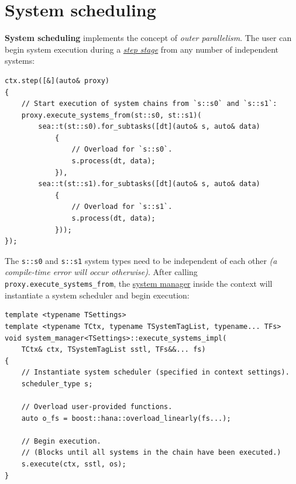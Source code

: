 \documentclass[oneside, 12pt, a4paper, openany]{book}
\begin{document}
\section{System scheduling}\label{system-scheduling}

\textbf{System scheduling} implements the concept of \emph{outer
parallelism}. The user can begin system execution during a
\protect\hyperlink{step_stage}{\emph{step stage}} from any number of
independent systems:

\begin{verbatim}
ctx.step([&](auto& proxy)
{
    // Start execution of system chains from `s::s0` and `s::s1`:
    proxy.execute_systems_from(st::s0, st::s1)(
        sea::t(st::s0).for_subtasks([dt](auto& s, auto& data)
            {
                // Overload for `s::s0`.
                s.process(dt, data);
            }),
        sea::t(st::s1).for_subtasks([dt](auto& s, auto& data)
            {
                // Overload for `s::s1`.
                s.process(dt, data);
            }));
});
\end{verbatim}

The
\texttt{s::s0}
and
\texttt{s::s1}
system types need to be independent of each other \emph{(a compile-time
error will occur otherwise)}. After calling
\texttt{proxy.execute_systems_from},
the \protect\hyperlink{architecture_system_mgr}{system manager} inside
the context will instantiate a system scheduler and begin execution:

\begin{verbatim}
template <typename TSettings>
template <typename TCtx, typename TSystemTagList, typename... TFs>
void system_manager<TSettings>::execute_systems_impl(
    TCtx& ctx, TSystemTagList sstl, TFs&&... fs)
{
    // Instantiate system scheduler (specified in context settings).
    scheduler_type s;

    // Overload user-provided functions.
    auto o_fs = boost::hana::overload_linearly(fs...);

    // Begin execution.
    // (Blocks until all systems in the chain have been executed.)
    s.execute(ctx, sstl, os);
}
\end{verbatim}
\end{document}
